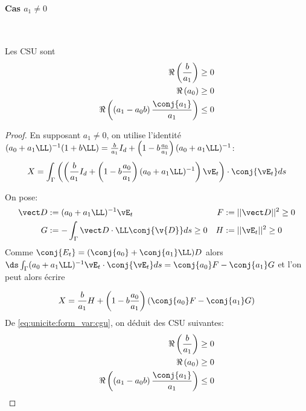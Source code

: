       \paragraph{Cas \(a_1\not=0\)}
        ~
        \begin{prop}
          Les CSU sont
          \begin{align}
            \Re\left(\frac{b}{a_1}\right) \ge 0 \\
            \Re\left(a_0\right) \ge 0 \\
            \Re\left(\left(a_1-a_0 b\right)\frac{\conj{a_1}}{a_1}\right) \le 0
          \end{align}
        \end{prop}
        \begin{proof}
          En supposant \(a_1 \not=0\), on utilise l'identité \((a_0 + a_1 \LL)^{-1}(1 + b \LL)  = \frac{b}{a_1} I_d + \left(1-b\frac{a_0}{a_1}\right)(a_0+a_1 \LL)^{-1}\):
          \[
            X = \int_\Gamma \left(\left(\frac{b}{a_1} I_d + \left(1-b\frac{a_0}{a_1}\right)(a_0+a_1 \LL)^{-1}\right)\vE_t\right) \cdot \conj{\vE_t} ds
          \]

          On pose:
          \begin{align*}
            \vect D &:= (a_0 + a_1 \LL)^{-1}\vE_t & F&:= || \vect D || ^2 \ge 0  \\
            G&:= -\int_\Gamma \vect D \cdot \LL\conj{\v{D}} ds \ge 0 & H &:= || \vE_t || ^2 \ge 0
          \end{align*}
          Comme \(\conj{E_t} = (\conj{a_0} + \conj{a_1}\LL)D\) alors \(\ds\int_\Gamma (a_0 +a_1 \LL) ^{-1}\vE_t\cdot \conj{\vE_t} ds = \conj{a_0} F - \conj{a_1} G\) et l'on peut alors écrire

          \begin{equation}
            \label{eq:unicite:form_var:decomp_cgu_ci1_a1}
            X = \frac{b}{a_1}H   + \left(1-b\frac{a_0}{a_1}\right)\left(\conj{a_0} F - \conj{a_1} G\right)
          \end{equation}
          De \eqref{eq:unicite:form_var:cgu}, on déduit des CSU suivantes:
          \begin{align}
            \Re\left(\frac{b}{a_1}\right) \ge 0 \\
            \Re\left(a_0\right) \ge 0 \\
            \Re\left(\left(a_1-a_0 b\right)\frac{\conj{a_1}}{a_1}\right) \le 0
          \end{align}
        \end{proof}

